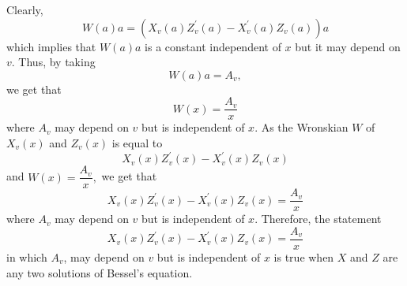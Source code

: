 \documentclass{article}
\begin{document}
\begin{flushleft}
Clearly, 
$$W(a) a=\left(X_{v}(a) Z_{v}^{\prime}(a)-X_{v}^{\prime}(a) Z_{v}(a)\right) a$$
which implies that $W(a) a$ is a constant
independent of $x$ but it may depend on $v$. Thus, by taking 
$$W(a) a=A_{v},$$ 
we get that 
$$W(x)=\frac{A_{v}}{x}$$ 
where $A_{v}$ may depend on $v$ but is independent of $x$. As the Wronskian $W$ of $X_{v}(x)$ and $Z_{v}(x)$ is equal to 
$$X_{v}(x) Z_{v}^{\prime}(x)-X_{v}^{\prime}(x) Z_{v}(x)$$ 
and $W(x)=\dfrac{A_{v}}{x},$ we get that 
$$X_{v}(x) Z_{v}^{\prime}(x)-X_{v}^{\prime}(x) Z_{v}(x)=\frac{A_{v}}{x}$$ 
where $A_{v}$ may depend on $v$ but
is independent of $x$. Therefore, the statement  
$$X_{v}(x) Z_{v}^{\prime}(x)-X_{v}^{\prime}(x) Z_{v}(x)=\frac{A_{v}}{x}$$ 
in which $A_{v}$, may depend on $v$ but is independent of $x$ is true when $X$ and $Z$ are any two solutions of Bessel's
equation.

\newpage



\end{flushleft}
\end{document}
